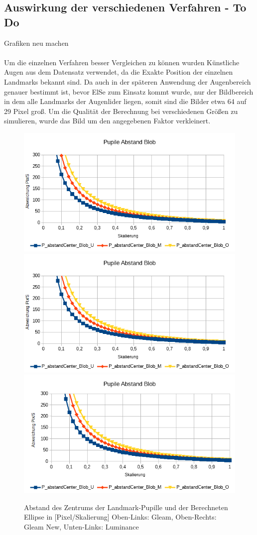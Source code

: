 \subsection{Auswirkung der verschiedenen Verfahren - To Do}
Grafiken neu machen\\\\
Um die einzelnen Verfahren besser Vergleichen zu können wurden Künstliche Augen aus dem Datensatz \cite{database_Eye} verwendet, da die Exakte Position der einzelnen Landmarks bekannt sind.
Da auch in der späteren Anwendung der Augenbereich genauer bestimmt ist, bevor ElSe zum Einsatz kommt wurde, nur der Bildbereich in dem alle Landmarks der Augenlider liegen, somit sind die Bilder etwa 64 auf 29 Pixel groß. Um die Qualität der Berechnung bei verschiedenen Größen zu simulieren, wurde das Bild um den angegebenen Faktor verkleinert.\\
\begin{figure}
	\centering
	\includegraphics[width=0.45\linewidth]{ElSe_Img/ElSe_22G_Pupile_Zentrum}
	\includegraphics[width=0.45\linewidth]{ElSe_Img/ElSe_Gray_15_Pupile_Zentrum}
	\includegraphics[width=0.45\linewidth]{ElSe_Img/ElSe_Norm_15_Pupile_Zentrum}
	\caption{Abstand des Zentrums der Landmark-Pupille und der Berechneten Ellipse in [Pixel/Skalierung] Oben-Links: Gleam, Oben-Rechts: Gleam New, Unten-Links: Luminance}
	\label{ElSe_Gray_Zentrum}
\end{figure}
